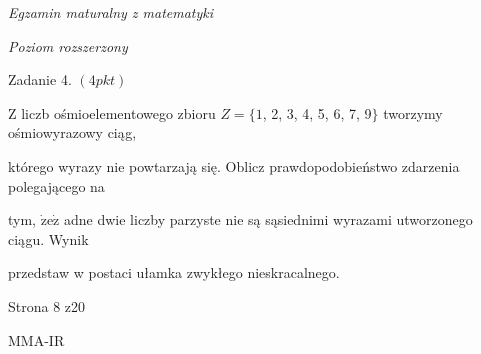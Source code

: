\documentclass[a4paper,12pt]{article}
\begin{document}
{\it Egzamin maturalny z matematyki}

{\it Poziom rozszerzony}

Zadanie 4. $(4pkt)$

$\mathrm{Z}$ liczb ośmioelementowego zbioru $Z=\{1$, 2, 3, 4, 5, 6, 7, 9$\}$ tworzymy ośmiowyrazowy ciąg,

którego wyrazy nie powtarzają się. Oblicz prawdopodobieństwo zdarzenia polegającego na

tym, $\dot{\mathrm{z}}\mathrm{e}\dot{\mathrm{z}}$ adne dwie liczby parzyste nie są sąsiednimi wyrazami utworzonego ciągu. Wynik

przedstaw w postaci ułamka zwykłego nieskracalnego.

Strona 8 z20

MMA-IR
\end{document}

